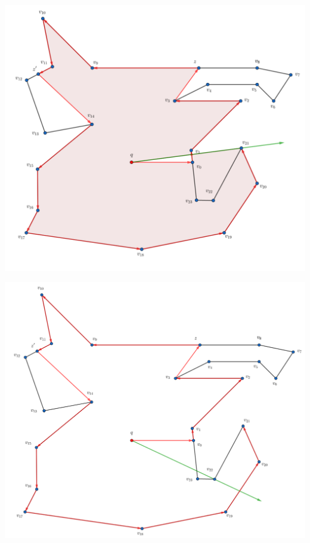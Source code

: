 \begin{frame}
  \centering \includegraphics[width=0.70 \paperwidth]{images/Ejecucion/e26.png}
\end{frame}

\begin{frame}
  \centering \includegraphics[width=0.70 \paperwidth]{images/Ejecucion/e27.png}
\end{frame}

